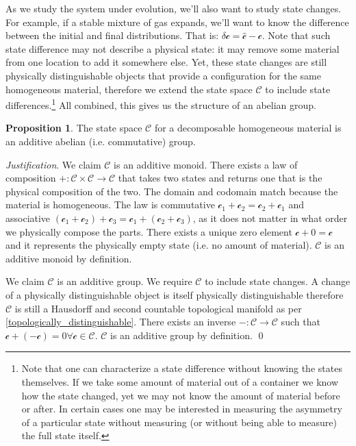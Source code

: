 \documentclass[aps,pra,10pt,twocolumn,floatfix,nofootinbib]{revtex4-1}
\numberwithin{equation}{section}
\theoremstyle{definition}
\newtheorem{prop}[equation]{Proposition}
\newenvironment{justification}{\emph{Justification}.}{\qed}
\begin{document}
As we study the system under evolution, we'll also want to study state changes. For example, if a stable mixture of gas expands, we'll want to know the difference between the initial and final distributions. That is: $\delta\mathcal{c}=\hat{\mathcal{c}}-\mathcal{c}$. Note that such state difference may not describe a physical state: it may remove some material from one location to add it somewhere else. Yet, these state changes are still physically distinguishable objects that provide a configuration for the same homogeneous material, therefore we extend the state space $\mathcal{C}$ to include state differences.\footnote{Note that one can characterize a state difference without knowing the states themselves. If we take some amount of material out of a container we know how the state changed, yet we may not know the amount of material before or after. In certain cases one may be interested in measuring the asymmetry of a particular state without measuring (or without being able to measure) the full state itself.} All combined, this gives us the structure of an abelian group.

\begin{prop}\label{reducible_state_space}
The state space $\mathcal{C}$ for a decomposable homogeneous material is an additive abelian (i.e. commutative) group.
\end{prop}

\begin{justification}
We claim $\mathcal{C}$ is an additive monoid. There exists a law of composition $+ : \mathcal{C} \times \mathcal{C} \rightarrow \mathcal{C}$ that takes two states and returns one that is the physical composition of the two. The domain and codomain match because the material is homogeneous. The law is commutative $\mathcal{c}_1 +\mathcal{c}_2 = \mathcal{c}_2+\mathcal{c}_1$ and associative $(\mathcal{c}_1 + \mathcal{c}_2) + \mathcal{c}_3 = \mathcal{c}_1 + (\mathcal{c}_2 + \mathcal{c}_3)$, as it does not matter in what order we physically compose the parts. There exists a unique zero element $\mathcal{c} + 0 = \mathcal{c}$ and it represents the physically empty state (i.e. no amount of material). $\mathcal{C}$ is an additive monoid by definition.

We claim $\mathcal{C}$ is an additive group. We require $\mathcal{C}$ to include state changes. A change of a physically distinguishable object is itself physically distinguishable therefore $\mathcal{C}$ is still a Hausdorff and second countable topological manifold as per \ref{topologically_distinguishable}. There exists an inverse $- : \mathcal{C} \rightarrow \mathcal{C}$ such that $\mathcal{c} + ( - \mathcal{c}) = 0 \forall \mathcal{c} \in \mathcal{C}$. $\mathcal{C}$ is an additive group by definition. 
\end{justification}
\end{document}
